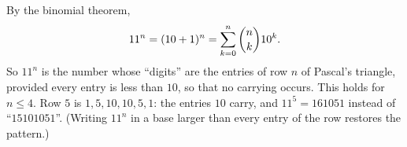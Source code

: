 By the binomial theorem,
\[
11^n=(10+1)^n=\sum_{k=0}^{n}\dbinom nk10^k .
\]
So $11^n$ is the number whose ``digits'' are the entries of row $n$ of Pascal's triangle, provided every entry is less than $10$, so that no carrying occurs. This holds for $n\le4$. Row $5$ is $1,5,10,10,5,1$: the entries $10$ carry, and $11^5=161051$ instead of ``$15101051$''. (Writing $11^n$ in a base larger than every entry of the row restores the pattern.)
